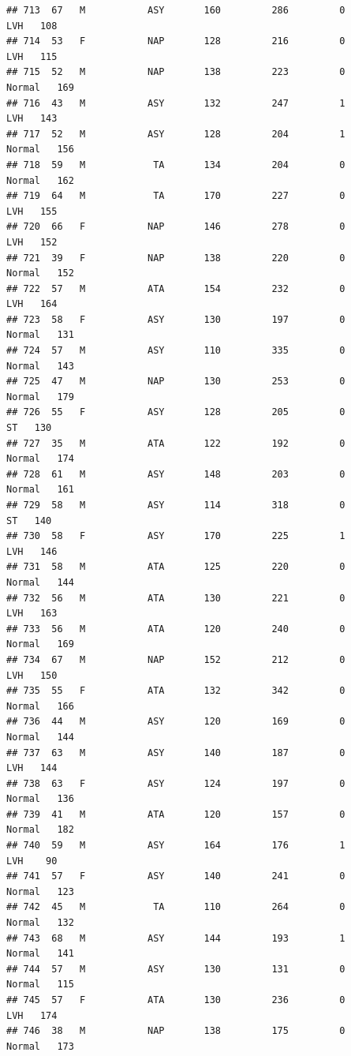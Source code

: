 \documentclass[
]{article}
\begin{document}
\begin{verbatim}
## 713  67   M           ASY       160         286         0        LVH   108
## 714  53   F           NAP       128         216         0        LVH   115
## 715  52   M           NAP       138         223         0     Normal   169
## 716  43   M           ASY       132         247         1        LVH   143
## 717  52   M           ASY       128         204         1     Normal   156
## 718  59   M            TA       134         204         0     Normal   162
## 719  64   M            TA       170         227         0        LVH   155
## 720  66   F           NAP       146         278         0        LVH   152
## 721  39   F           NAP       138         220         0     Normal   152
## 722  57   M           ATA       154         232         0        LVH   164
## 723  58   F           ASY       130         197         0     Normal   131
## 724  57   M           ASY       110         335         0     Normal   143
## 725  47   M           NAP       130         253         0     Normal   179
## 726  55   F           ASY       128         205         0         ST   130
## 727  35   M           ATA       122         192         0     Normal   174
## 728  61   M           ASY       148         203         0     Normal   161
## 729  58   M           ASY       114         318         0         ST   140
## 730  58   F           ASY       170         225         1        LVH   146
## 731  58   M           ATA       125         220         0     Normal   144
## 732  56   M           ATA       130         221         0        LVH   163
## 733  56   M           ATA       120         240         0     Normal   169
## 734  67   M           NAP       152         212         0        LVH   150
## 735  55   F           ATA       132         342         0     Normal   166
## 736  44   M           ASY       120         169         0     Normal   144
## 737  63   M           ASY       140         187         0        LVH   144
## 738  63   F           ASY       124         197         0     Normal   136
## 739  41   M           ATA       120         157         0     Normal   182
## 740  59   M           ASY       164         176         1        LVH    90
## 741  57   F           ASY       140         241         0     Normal   123
## 742  45   M            TA       110         264         0     Normal   132
## 743  68   M           ASY       144         193         1     Normal   141
## 744  57   M           ASY       130         131         0     Normal   115
## 745  57   F           ATA       130         236         0        LVH   174
## 746  38   M           NAP       138         175         0     Normal   173

\end{verbatim}
\end{document}
